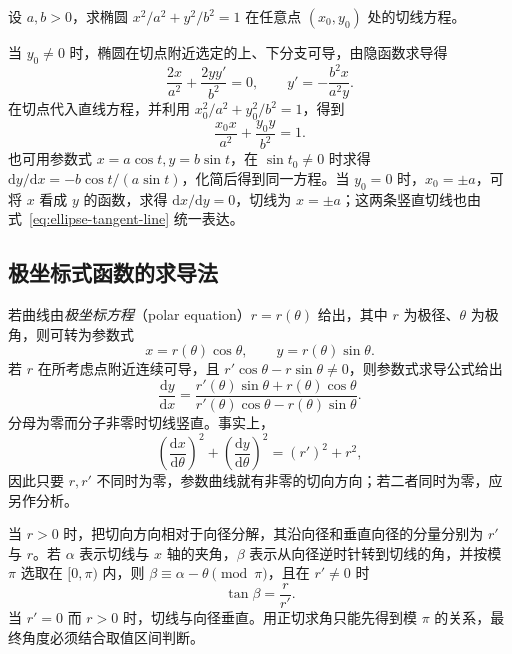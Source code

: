 \documentclass[UTF8,12pt,a4paper,fontset=fandol]{ctexbook}
\begin{document}
\begin{example}
\label{ex:ellipse-tangent-parametric-and-implicit}
设 $a,b>0$，求椭圆 $x^2/a^2+y^2/b^2=1$ 在任意点 $(x_0,y_0)$ 处的切线方程。
\end{example}
\begin{solve}
当 $y_0\ne0$ 时，椭圆在切点附近选定的上、下分支可导，由隐函数求导得
\[
    \frac{2x}{a^2}+\frac{2yy'}{b^2}=0,
    \qquad y'=-\frac{b^2x}{a^2y}.
\]
在切点代入直线方程，并利用 $x_0^2/a^2+y_0^2/b^2=1$，得到
\begin{equation}
\label{eq:ellipse-tangent-line}
    \frac{x_0x}{a^2}+\frac{y_0y}{b^2}=1.
\end{equation}
也可用参数式 $x=a\cos t,y=b\sin t$，在 $\sin t_0\ne0$ 时求得 $\mathrm dy/\mathrm dx=-b\cos t/(a\sin t)$，化简后得到同一方程。当 $y_0=0$ 时，$x_0=\pm a$，可将 $x$ 看成 $y$ 的函数，求得 $\mathrm dx/\mathrm dy=0$，切线为 $x=\pm a$；这两条竖直切线也由式~\eqref{eq:ellipse-tangent-line} 统一表达。
\end{solve}

\subsection{极坐标式函数的求导法}
\label{subsec:polar-differentiation}

若曲线由\emph{极坐标方程}（polar equation）$r=r(\theta)$ 给出，其中 $r$ 为极径、$\theta$ 为极角，则可转为参数式
\[
    x=r(\theta)\cos\theta,\qquad y=r(\theta)\sin\theta.
\]
若 $r$ 在所考虑点附近连续可导，且 $r'\cos\theta-r\sin\theta\ne0$，则参数式求导公式给出
\begin{equation}
\label{eq:polar-curve-derivative}
    \frac{\mathrm dy}{\mathrm dx}
    =\frac{r'(\theta)\sin\theta+r(\theta)\cos\theta}
    {r'(\theta)\cos\theta-r(\theta)\sin\theta}.
\end{equation}
分母为零而分子非零时切线竖直。事实上，
\[
    \left(\frac{\mathrm dx}{\mathrm d\theta}\right)^2
    +\left(\frac{\mathrm dy}{\mathrm d\theta}\right)^2
    =(r')^2+r^2,
\]
因此只要 $r,r'$ 不同时为零，参数曲线就有非零的切向方向；若二者同时为零，应另作分析。

当 $r>0$ 时，把切向方向相对于向径分解，其沿向径和垂直向径的分量分别为 $r'$ 与 $r$。若 $\alpha$ 表示切线与 $x$ 轴的夹角，$\beta$ 表示从向径逆时针转到切线的角，并按模 $\pi$ 选取在 $[0,\pi)$ 内，则 $\beta\equiv\alpha-\theta\pmod\pi$，且在 $r'\ne0$ 时
\begin{equation}
\label{eq:polar-radius-tangent-angle}
    \tan\beta=\frac r{r'}.
\end{equation}
当 $r'=0$ 而 $r>0$ 时，切线与向径垂直。用正切求角只能先得到模 $\pi$ 的关系，最终角度必须结合取值区间判断。
\end{document}
